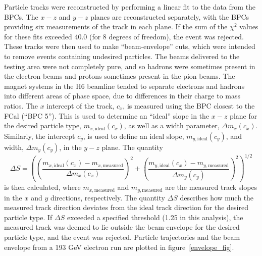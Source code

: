 Particle tracks were reconstructed by performing a linear fit to the data from the BPCs. The $x-z$ and $y-z$ planes are reconstructed separately, with the BPCs providing six measurements of the track in each plane. If the sum of the $\chi^2$ values for these fits exceeded 40.0 (for 8 degrees of freedom), the event was rejected. These tracks were then used to make ``beam-envelope'' cuts, which were intended to remove events containing undesired particles. The beams delivered to the testing area were not completely pure, and so hadrons were sometimes present in the electron beams and protons sometimes present in the pion beams. The magnet systems in the H6 beamline tended to separate electrons and hadrons into different areas of phase space, due to differences in their charge to mass ratios. The $x$ intercept of the track, $c_x$, is measured using the BPC closest to the FCal (``BPC 5''). This is used to determine an ``ideal'' slope in the $x-z$ plane for the desired particle type, $m_{x,\mathrm{ideal}}(c_x)$, as well as a width parameter, $\Delta m_x (c_x)$. Similarly, the intercept $c_y$, is used to define an ideal slope, $m_{y,\mathrm{ideal}}(c_y)$, and width, $\Delta m_y (c_y)$, in the $y-z$ plane.
%
% 
The quantity 
\begin{equation}
\Delta S = \left(\left( \frac{ m_{x,\mathrm{ideal}}(c_x) - m_{x,\mathrm{measured}} }{ \Delta m_x (c_x)} \right)^2 + \left( \frac{ m_{y,\mathrm{ideal}}(c_x) - m_{y,\mathrm{measured}} }{ \Delta m_y (c_y)} \right)^2 \right)^{1/2}
\end{equation}
is then calculated, where $m_{x,\mathrm{measured}}$ and $m_{y,\mathrm{measured}}$ are the measured track slopes in the $x$ and $y$ directions, respectively. The quantity $\Delta S$ describes how much the measured track direction deviates from the ideal track direction for the desired particle type. If $\Delta S$ exceeded a specified threshold (1.25 in this analysis), the measured track was deemed to lie outside the beam-envelope for the desired particle type, and the event was rejected. Particle trajectories and the beam envelope from a 193 GeV electron run are plotted in figure~\ref{envelope_fig}.

